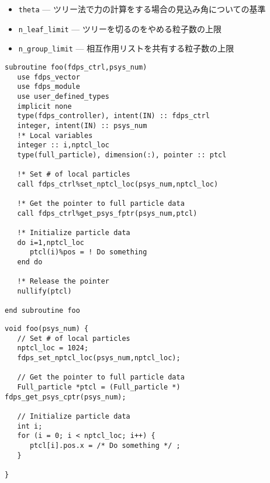 \begin{itemize}[leftmargin=*,itemsep=-1ex,topsep=0.2ex]
\item \texttt{theta} --- ツリー法で力の計算をする場合の見込み角についての基準
\item \texttt{n\_leaf\_limit} --- ツリーを切るのをやめる粒子数の上限
\item \texttt{n\_group\_limit} --- 相互作用リストを共有する粒子数の上限
\end{itemize}

\ifFtn%
\begin{lstlisting}[caption=粒子データの初期化]
subroutine foo(fdps_ctrl,psys_num)
   use fdps_vector
   use fdps_module
   use user_defined_types
   implicit none
   type(fdps_controller), intent(IN) :: fdps_ctrl
   integer, intent(IN) :: psys_num
   !* Local variables
   integer :: i,nptcl_loc
   type(full_particle), dimension(:), pointer :: ptcl

   !* Set # of local particles
   call fdps_ctrl%set_nptcl_loc(psys_num,nptcl_loc)

   !* Get the pointer to full particle data
   call fdps_ctrl%get_psys_fptr(psys_num,ptcl)
   
   !* Initialize particle data
   do i=1,nptcl_loc
      ptcl(i)%pos = ! Do something
   end do
   
   !* Release the pointer
   nullify(ptcl)

end subroutine foo
\end{lstlisting}
\endifFtn
\ifC%
\begin{lstlisting}[caption=粒子データの初期化]
void foo(psys_num) {
   // Set # of local particles
   nptcl_loc = 1024; 
   fdps_set_nptcl_loc(psys_num,nptcl_loc);

   // Get the pointer to full particle data
   Full_particle *ptcl = (Full_particle *)  fdps_get_psys_cptr(psys_num);
   
   // Initialize particle data
   int i;
   for (i = 0; i < nptcl_loc; i++) {
      ptcl[i].pos.x = /* Do something */ ;
   }
   
}
\end{lstlisting}
